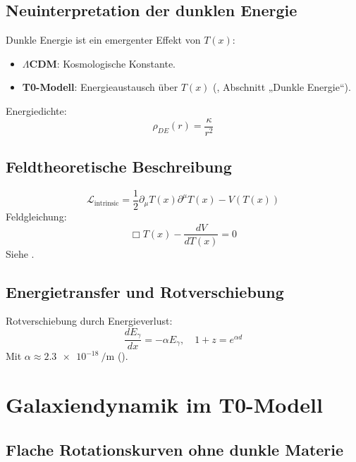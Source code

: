 \documentclass[a4paper,12pt]{article}
\theoremstyle{definition}
\theoremstyle{remark}
\newcommand{\Tfield}{T(x)}
\begin{document}
	\subsection{Neuinterpretation der dunklen Energie}
	
	Dunkle Energie ist ein emergenter Effekt von \(\Tfield\):
	\begin{itemize}
		\item \textbf{\(\Lambda\)CDM}: Kosmologische Konstante.
		\item \textbf{T0-Modell}: Energieaustausch über \(\Tfield\) (\cite{pascher_energy_2025}, Abschnitt „Dunkle Energie“).
	\end{itemize}
	Energiedichte:
	\begin{equation}
		\rho_{DE}(r) = \frac{\kappa}{r^2}
	\end{equation}
	
	\subsection{Feldtheoretische Beschreibung}
	
	\begin{equation}
		\mathcal{L}_\text{intrinsic} = \frac{1}{2} \partial_\mu \Tfield \partial^\mu \Tfield - V(\Tfield)
	\end{equation}
	Feldgleichung:
	\begin{equation}
		\Box \Tfield - \frac{dV}{d\Tfield} = 0
	\end{equation}
	Siehe \cite{pascher_lagrange_2025}.
	
	\subsection{Energietransfer und Rotverschiebung}
	
	Rotverschiebung durch Energieverlust:
	\begin{equation}
		\frac{d E_{\gamma}}{d x} = -\alpha E_{\gamma}, \quad 1 + z = e^{\alpha d}
	\end{equation}
	Mit \(\alpha \approx \SI{2.3e-18}{\per\meter}\) (\cite{pascher_messdifferenzen_2025}).
	
	\section{Galaxiendynamik im T0-Modell}
	
	\subsection{Flache Rotationskurven ohne dunkle Materie}
	
\end{document}
